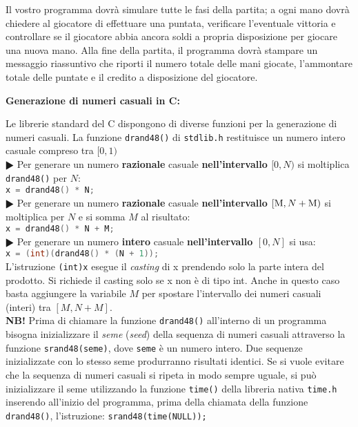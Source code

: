 \documentclass[11pt]{article}
\begin{document}
Il vostro programma dovr\`a simulare tutte le fasi della partita; a ogni mano dovr\`a chiedere al giocatore di effettuare una puntata, verificare l'eventuale vittoria e controllare se il giocatore abbia ancora soldi a propria disposizione per giocare una nuova mano. Alla fine della partita, il programma dovr\`a stampare un messaggio riassuntivo che riporti il numero totale delle mani giocate, l'ammontare totale delle puntate e il credito a disposizione del giocatore.


\vspace{4mm}

\begin{mdframed}[backgroundcolor=panna]
\textbf{Generazione di numeri casuali in C:}

Le librerie standard del C dispongono di diverse funzioni per la generazione di numeri casuali.
La funzione \texttt{drand48()} di \texttt{stdlib.h} restituisce un numero intero casuale compreso tra $[0,1)$ \@
\\
\textbf{$\RHD$} Per generare un numero {\bf razionale} casuale {\bf nell'intervallo $[0, N)$} si moltiplica \texttt{drand48()} per $N$:\@
\\
\lstinline[language=c]!x = drand48() * N;!
\\
\textbf{$\RHD$} Per generare un numero {\bf razionale} casuale {\bf nell'intervallo $[{\rm M}, N+{\rm M})$} si moltiplica per $N$ e si somma $M$ al risultato:\@
\\
\lstinline[language=c]!x = drand48() * N + M;!
\\
\textbf{$\RHD$} Per generare un numero {\bf intero} casuale {\bf nell'intervallo $[0, N]$ } si usa:\@
\\
\lstinline[language=c]!x = (int)(drand48() * (N + 1));!
\\L'istruzione \texttt{(int)x} esegue il {\em casting\/} di x prendendo solo la parte intera del prodotto. Si richiede il casting solo se x non \`{e} di tipo int. Anche in questo caso basta aggiungere la variabile $M$ per spostare l'intervallo dei numeri casuali (interi) tra $[M, N + M]$.\@
\\
{\bf NB!} Prima di chiamare la funzione \texttt{drand48()} all'interno di un programma bisogna inizializzare il {\em seme\/} (\textit{seed}) della sequenza di numeri casuali attraverso la funzione \texttt{srand48(seme)}, dove \texttt{seme} \`e un numero intero. Due sequenze inizializzate con lo stesso seme produrranno risultati identici. Se si vuole evitare che la sequenza di numeri casuali si ripeta in modo sempre uguale, si pu\`o inizializzare il seme utilizzando la funzione \texttt{time()} della libreria
nativa \texttt{time.h} inserendo all'inizio del programma, prima della chiamata della funzione \texttt{drand48()}, l'istruzione: \texttt{srand48(time(NULL));}
\end{mdframed}
\end{document}
